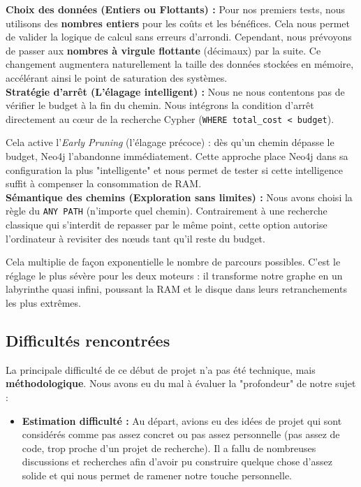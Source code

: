 \documentclass{article}
\begin{document}
    \textbf{Choix des données (Entiers ou Flottants) :} 
    Pour nos premiers tests, nous utilisons des \textbf{nombres entiers} pour les coûts et les bénéfices. Cela nous permet de valider la logique de calcul sans erreurs d'arrondi. Cependant, nous prévoyons de passer aux \textbf{nombres à virgule flottante} (décimaux) par la suite. Ce changement augmentera naturellement la taille des données stockées en mémoire, accélérant ainsi le point de saturation des systèmes. \\

    \textbf{Stratégie d'arrêt (L'élagage intelligent) :} 
    Nous ne nous contentons pas de vérifier le budget à la fin du chemin. Nous intégrons la condition d'arrêt directement au cœur de la recherche Cypher (\texttt{WHERE total\_cost < budget}). 

    Cela active l'\textit{Early Pruning} (l'élagage précoce) : dès qu'un chemin dépasse le budget, Neo4j l'abandonne immédiatement. Cette approche place Neo4j dans sa configuration la plus "intelligente" et nous permet de tester si cette intelligence suffit à compenser la consommation de RAM. \\

    \textbf{Sémantique des chemins (Exploration sans limites) :} 
    Nous avons choisi la règle du \texttt{ANY PATH} (n'importe quel chemin). Contrairement à une recherche classique qui s'interdit de repasser par le même point, cette option autorise l'ordinateur à revisiter des nœuds tant qu'il reste du budget. 

    Cela multiplie de façon exponentielle le nombre de parcours possibles. C'est le réglage le plus sévère pour les deux moteurs : il transforme notre graphe en un labyrinthe quasi infini, poussant la RAM et le disque dans leurs retranchements les plus extrêmes. \\


    \subsection{Difficultés rencontrées}

    La principale difficulté de ce début de projet n'a pas été technique, mais \textbf{méthodologique}. Nous avons eu du mal à évaluer la "profondeur" de notre sujet :

    \begin{itemize}


        \item \textbf{Estimation difficulté :} Au départ, avions eu des idées de projet qui sont considérés comme pas assez concret ou pas assez personnelle (pas assez de code, trop proche d'un projet de recherche). Il a fallu de nombreuses discussions et recherches afin d'avoir pu construire quelque chose d'assez solide et qui nous permet de ramener notre touche personnelle. \\
        

    \end{itemize} 
\end{document}
